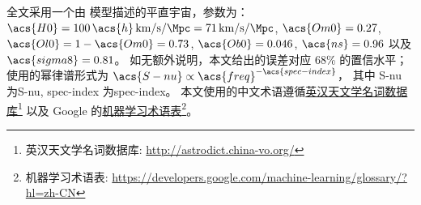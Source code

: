 全文采用一个由 \lcdm 模型描述的平直宇宙，参数为：
$\acs{H0} = 100\,\acs{h}\,\si{\km\per\second\per\Mpc}
= \SI{71}{\km\per\second\per\Mpc}$,
$\acs{Om0} = 0.27$,
$\acs{Ol0} = 1 - \acs{Om0} = 0.73$,
$\acs{Ob0} = 0.046$,
$\acs{ns} = 0.96$ 以及 $\acs{sigma8} = 0.81$。
如无额外说明，本文给出的误差对应 68\% 的置信水平；
使用的幂律谱形式为 $\acs{S-nu} \propto \acs{freq}^{-\acs{spec-index}}$，
其中 \acs{S-nu} 为\acl{S-nu}, \acs{spec-index} 为\acl{spec-index}。
本文使用的中文术语遵循\href{%
  http://astrodict.china-vo.org/
}{英汉天文学名词数据库}\footnote{%
  英汉天文学名词数据库:
  \url{http://astrodict.china-vo.org/}}
以及 Google 的\href{%
  https://developers.google.com/machine-learning/glossary/?hl=zh-CN
}{机器学习术语表}\footnote{%
  机器学习术语表:
  \url{https://developers.google.com/machine-learning/glossary/?hl=zh-CN}}。


